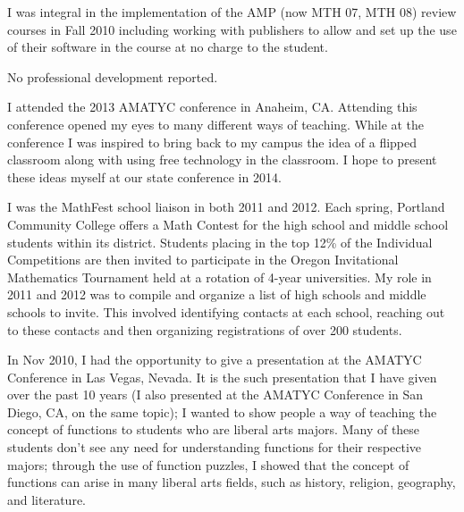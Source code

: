 \begin{description}[style=nextline]
	I was integral in the implementation of the AMP (now MTH 07, MTH 08) review
	courses in Fall 2010 including working with publishers to allow and set up the
	use of their software in the course at no charge to the student.

	\item[Will Freeman (Full-time Instructor, Sylvania Campus)]

        No professional development reported.

	\item[Wendy Fresh (Full-time Instructor, Rock Creek Campus)]
	I attended the 2013 AMATYC conference in Anaheim, CA.  Attending this
	conference opened my eyes to many different ways of teaching.  While at the
	conference I was inspired to bring back to my campus the idea of a
	flipped classroom along with using free technology in the classroom.  I
	hope to present these ideas myself at our state conference in 2014.

	I was the MathFest school liaison in both 2011 and 2012.  Each spring, Portland
	Community College offers a Math Contest for the high school and middle school
	students within its district.  Students placing in the top 12\% of the
	Individual Competitions are then invited to participate in the Oregon
	Invitational Mathematics Tournament held at a rotation of 4-year universities.
	My role in 2011 and 2012 was to compile and organize a list of high schools and
	middle schools to invite.  This involved identifying contacts at each school,
	reaching out to these contacts and then organizing registrations of over 200
	students.

	\item[Matthew Funk (Faculty Chair, Southeast Campus)]
	In Nov 2010, I had the opportunity to give a presentation at the AMATYC
	Conference in Las Vegas, Nevada.  It is the  such presentation that I have
	given over the past 10 years (I also presented at the AMATYC Conference in San
	Diego, CA, on the same topic); I wanted to show people a way of teaching the
	concept of functions to students who are liberal arts majors.  Many of these
	students don't see any need for understanding functions for their respective
	majors; through the use of function puzzles, I showed that the concept of
	functions can arise in many liberal arts fields, such as history, religion,
	geography, and literature.


\end{description}
